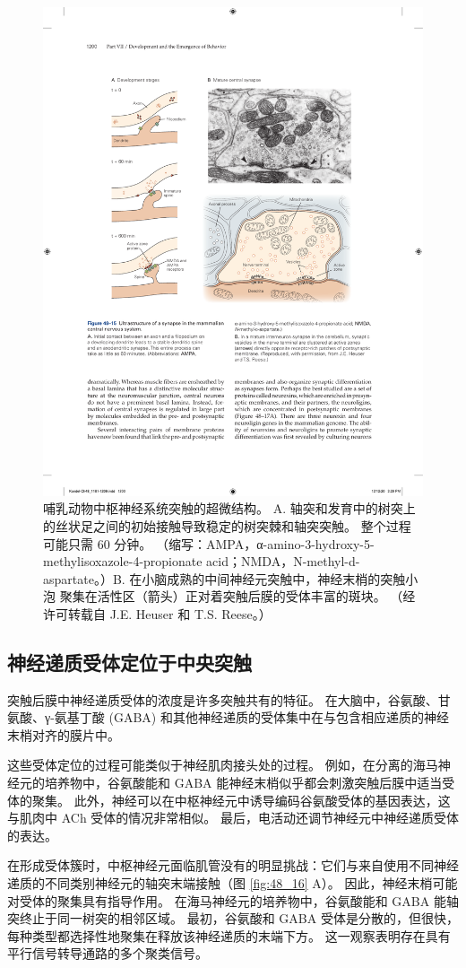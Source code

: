 \begin{figure}[htbp]
	\centering
	\includegraphics[width=0.75\linewidth]{chap48/fig_48_15}
	\caption{哺乳动物中枢神经系统突触的超微结构。 A. 轴突和发育中的树突上的丝状足之间的初始接触导致稳定的树突棘和轴突突触。 整个过程可能只需 60 分钟。 （缩写：AMPA，α-amino-3-hydroxy-5-methylisoxazole-4-propionate acid；NMDA，N-methyl-d-aspartate。）B. 在小脑成熟的中间神经元突触中，神经末梢的突触小泡 聚集在活性区（箭头）正对着突触后膜的受体丰富的斑块。 （经许可转载自 J.E. Heuser 和 T.S. Reese。）}
	\label{fig:48_15}
\end{figure}

\subsection{神经递质受体定位于中央突触}
突触后膜中神经递质受体的浓度是许多突触共有的特征。 在大脑中，谷氨酸、甘氨酸、γ-氨基丁酸 (GABA) 和其他神经递质的受体集中在与包含相应递质的神经末梢对齐的膜片中。

这些受体定位的过程可能类似于神经肌肉接头处的过程。 例如，在分离的海马神经元的培养物中，谷氨酸能和 GABA 能神经末梢似乎都会刺激突触后膜中适当受体的聚集。 此外，神经可以在中枢神经元中诱导编码谷氨酸受体的基因表达，这与肌肉中 ACh 受体的情况非常相似。 最后，电活动还调节神经元中神经递质受体的表达。

在形成受体簇时，中枢神经元面临肌管没有的明显挑战：它们与来自使用不同神经递质的不同类别神经元的轴突末端接触（图 \ref{fig:48_16} A）。 
因此，神经末梢可能对受体的聚集具有指导作用。 在海马神经元的培养物中，谷氨酸能和 GABA 能轴突终止于同一树突的相邻区域。 最初，谷氨酸和 GABA 受体是分散的，但很快，每种类型都选择性地聚集在释放该神经递质的末端下方。 这一观察表明存在具有平行信号转导通路的多个聚类信号。


